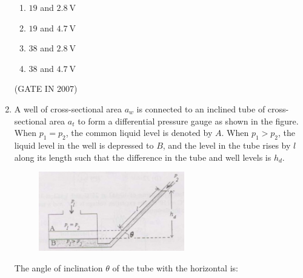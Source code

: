 \documentclass[journal]{IEEEtran}
\begin{document}
\begin{enumerate}
\begin{multicols}{4}
\begin{enumerate}
\item $19$ and $2.8\ \mathrm{V}$  
\item $19$ and $4.7\ \mathrm{V}$  
\item $38$ and $2.8\ \mathrm{V}$  
\item $38$ and $4.7\ \mathrm{V}$  
\end{enumerate}
\end{multicols}
\hfill(GATE IN 2007)
\item A well of cross-sectional area $ a_w $ is connected to an inclined tube of cross-sectional area $ a_t $ to form a differential pressure gauge as shown in the figure. When $ p_1 = p_2 $, the common liquid level is denoted by $ A $. When $ p_1 > p_2 $, the liquid level in the well is depressed to $ B $, and the level in the tube rises by $ l $ along its length such that the difference in the tube and well levels is $ h_d $.
\begin{figure}[H]
    \centering
      \includegraphics[width=0.6\textwidth]{26.jpg} 
      \caption{}
    \label{fig:fig26} 
\end{figure}
The angle of inclination $ \theta $ of the tube with the horizontal is:


\end{enumerate}
\end{document}
